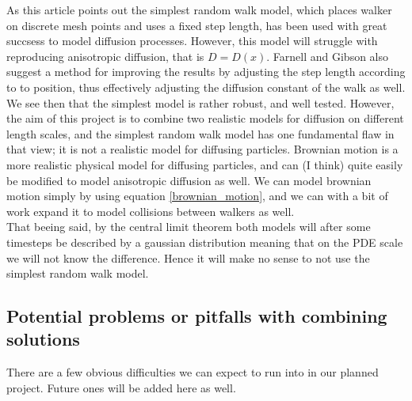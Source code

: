As this article points out \cite{farnell2005monte} the simplest random walk model, which places walker on discrete mesh points and uses a fixed step length, has been used with great succsess to model diffusion processes. 
However, this model will struggle with reproducing anisotropic diffusion, that is $D = D(x)$. Farnell and Gibson also suggest a method for improving the results by adjusting the step length according to to position, thus effectively adjusting the diffusion constant of the walk as well. 
We see then that the simplest model is rather robust, and well tested. 
However, the aim of this project is to combine two realistic models for diffusion on different length scales, and the simplest random walk model has one fundamental flaw in that view; it is not a realistic model for diffusing particles. 
Brownian motion is a more realistic physical model for diffusing particles, and can (I think) quite easily be modified to model anisotropic diffusion as well. 
We can model brownian motion simply by using equation \ref{brownian_motion}, and we can with a bit of work expand it to model collisions between walkers as well. \\
That beeing said, by the central limit theorem both models will after some timesteps be described by a gaussian distribution meaning that on the PDE scale we will not know the difference. 
Hence it will make no sense to not use the simplest random walk model.

\subsection{Potential problems or pitfalls with combining solutions}\label{problems_and_pitfalls}

There are a few obvious difficulties we can expect to run into in our planned project. 
Future ones will be added here as well.

